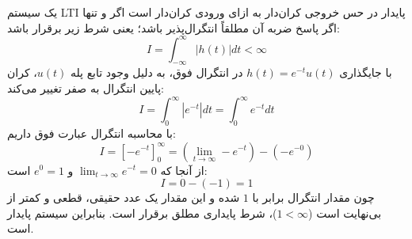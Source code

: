 یک سیستم LTI پایدار در حس خروجی کران‌دار به ازای ورودی کران‌دار است اگر و تنها اگر پاسخ ضربه آن مطلقاً انتگرال‌پذیر باشد؛ یعنی شرط زیر برقرار باشد:
\[
I = \int_{-\infty}^{\infty} |h(t)| dt < \infty
\]
با جایگذاری $h(t) = e^{-t} u(t)$ در انتگرال فوق، به دلیل وجود تابع پله $u(t)$، کران پایین انتگرال به صفر تغییر می‌کند:
\[
I = \int_{0}^{\infty} |e^{-t}| dt = \int_{0}^{\infty} e^{-t} dt
\]
با محاسبه انتگرال عبارت فوق داریم:
\[
I = \left[ -e^{-t} \right]_{0}^{\infty} = \left( \lim_{t \to \infty} -e^{-t} \right) - \left( -e^{-0} \right)
\]
از آنجا که $\lim_{t \to \infty} e^{-t} = 0$ و $e^0 = 1$ است:
\[
I = 0 - (-1) = 1
\]
چون مقدار انتگرال برابر با $1$ شده و این مقدار یک عدد حقیقی، قطعی و کمتر از بی‌نهایت است ($1 < \infty$)، شرط پایداری مطلق برقرار است. بنابراین {سیستم پایدار است}.
